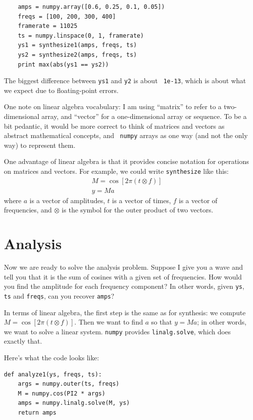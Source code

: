 \documentclass[12pt]{book}
\begin{document}
\begin{verbatim}
    amps = numpy.array([0.6, 0.25, 0.1, 0.05])
    freqs = [100, 200, 300, 400]
    framerate = 11025
    ts = numpy.linspace(0, 1, framerate)
    ys1 = synthesize1(amps, freqs, ts)
    ys2 = synthesize2(amps, freqs, ts)
    print max(abs(ys1 == ys2))
\end{verbatim}

The biggest difference between {\tt ys1} and {\tt y2} is about {\tt
  1e-13}, which is about what we expect due to floating-point errors.

One note on linear algebra vocabulary: I am using ``matrix'' to refer
to a two-dimensional array, and ``vector'' for a one-dimensional array
or sequence.  To be a bit pedantic, it would be more correct to think
of matrices and vectors as abstract mathematical concepts, and {\tt
  numpy} arrays as one way (and not the only way) to represent them.

One advantage of linear algebra is that it provides concise notation
for operations on matrices and vectors.  For example, we could write
{\tt synthesize} like this:
%
\begin{eqnarray*}
M = \cos [2 \pi (t \otimes f)] \\
y = M a
\end{eqnarray*}
%
where $a$ is a vector of amplitudes,
$t$ is a vector of times, $f$ is a vector of frequencies, and
$\otimes$ is the symbol for the outer product of two vectors.


\section{Analysis}

Now we are ready to solve the analysis problem.  Suppose I give you
a wave and tell you that it is the sum of cosines with a given set
of frequencies.  How would you find the amplitude for each frequency
component?  In other words, given {\tt ys}, {\tt ts} and {\tt freqs},
can you recover {\tt amps}?

In terms of linear algebra, the first step is the same as for
synthesis: we compute $M = \cos[2 \pi (t \otimes f)]$.  Then we want
to find $a$ so that $y = M a$; in other words, we want to solve a
linear system.  {\tt numpy} provides {\tt linalg.solve}, which does
exactly that.

Here's what the code looks like:

\begin{verbatim}
def analyze1(ys, freqs, ts):
    args = numpy.outer(ts, freqs)
    M = numpy.cos(PI2 * args)
    amps = numpy.linalg.solve(M, ys)
    return amps
\end{verbatim}
\end{document}
